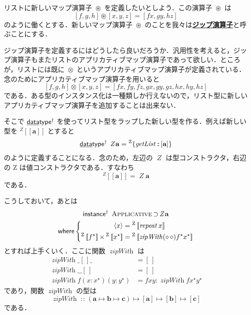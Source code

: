 \documentclass[a4paper,twocolumn]{jsbook}
\def\[{\left[\!\left[}
\def\]{\right]\!\right]}
\newcommand{\keyword}[1]{{\underline{\textbf{#1}}}}
\newcommand{\mKeyword}[1]{\mathsf{#1}} %
\newcommand{\mKeywordUnderline}[1]{\text{\underline{\textsf{#1}}}} %
\newcommand{\mDataTypeKeyword}{\mKeywordUnderline{data}\mKeyword{type}}
\newcommand{\mInstanceKeyword}{\mKeyword{instance}}
\newcommand{\mWhereKeyword}{\mKeyword{where}}
\DeclareMathOperator{\mDataTypeParametric}{\mDataTypeKeyword^\dagger}
\DeclareMathOperator{\mInstanceParametric}{\mInstanceKeyword^{\dagger}}
\DeclareMathOperator{\mSuperSet}{\supset}
\DeclareMathOperator{\mWhere}{\mWhereKeyword}
\newcommand{\mEmptyList}{{[\,]}}
\newcommand{\mAnyParam}{\_}
\newcommand{\mAnonParam}{\diamond}
\newcommand{\mFunc}[1]{\mathop{\mathit{#1}}}
\DeclareMathOperator{\mGetList}{\mFunc{getList}}
\DeclareMathOperator{\mRepeat}{\mFunc{repeat}}
\DeclareMathOperator{\mZipWith}{\mFunc{zipWith}}
\DeclareMathOperator{\mAppMap}{\times}
\DeclareMathOperator{\mAppMapList}{\otimes}
\DeclareMathOperator{\mIn}{{:\!:}}
\DeclareMathOperator{\mMapsTo}{\mapsto}
\DeclareMathOperator{\mZip}{\circledast}
\newcommand{\mZipList}{Z}
\newcommand{\mType}[1]{\mathbf{#1}}
\newcommand{\mListType}[1]{[\mType{#1}]}
\newcommand{\mTypeConstructor}[1]{\textit{#1}}
\DeclareMathOperator{\mZipListTypeConstructor}{\mTypeConstructor{\mZipList}}
\newcommand{\mGenericTypeAssemble}[2]{{}^{\mTypeConstructor{#1}}\[\mType{#2}\]}
\newcommand{\mZipListType}[1]{\mGenericTypeAssemble{\mZipList}{#1}}
\newcommand{\mGenericValueConstructor}[1]{\mathrm{#1}}
\newcommand{\mGenericWith}[2]{{}^\mGenericValueConstructor{#1}\[#2\]}
\newcommand{\mGenericRecordWith}[2]{{}^\mGenericValueConstructor{#1}\{#2\}}
\newcommand{\mZipListWith}[1]{\mGenericWith{\mZipList}{#1}}
\newcommand{\mListWith}[1]{\left[#1\right]}
\newcommand{\mPureWith}[1]{\langle#1\rangle}
\newcommand{\mGenericTypeClass}[1]{\textsc{#1}} %
\newcommand{\mApplicativeTypeClass}{\mGenericTypeClass{Applicative}}
\newcommand{\mList}[1]{{#1}^\mathrm{\star}}
\newcommand{\mProj}[2]{#1\mMapsTo#2}
\begin{document}
リストに新しいマップ演算子 $\mZip$ を定義したいとしよう．この演算子 $\mZip$ は
\begin{equation}
\mListWith{f,g,h}\mZip\mListWith{x,y,z}=\mListWith{fx,gy,hz}
\end{equation}
のように働くとする．新しいマップ演算子 $\mZip$ のことを我々は\keyword{ジップ演算子}と呼ぶことにする．

ジップ演算子を定義するにはどうしたら良いだろうか．汎用性を考えると，ジップ演算子もまたリストのアプリカティブマップ演算子であって欲しい．ところが，リストには既に $\mAppMapList$ というアプリカティブマップ演算子が定義されている．念のためにアプリカティブマップ演算子を用いると
\begin{equation}
\mListWith{f,g,h}\mAppMapList\mListWith{x,y,z}=\mListWith{fx,fy,fz,gx,gy,gz,hx,hy,hz}
\end{equation}
である．ある型のインスタンス化は一種類しか行えないので，リスト型に新しいアプリカティブマップ演算子を追加することは出来ない．

そこで $\mDataTypeParametric$ を使ってリスト型をラップした新しい型を作る．例えば新しい型を $\mZipListType{a}$ とすると
\begin{equation}
\label{eq:data-type-ziplist}
\mDataTypeParametric\;\mZipListTypeConstructor\mType{a}=\mGenericRecordWith{\mZipList}{\mGetList\mIn{}\mListType{a}}
\end{equation}
のように定義することになる．念のため，左辺の $\mZipListTypeConstructor$ は型コンストラクタ，右辺の $\mGenericValueConstructor{\mZipList}$ は値コンストラクタである．すなわち
\begin{equation}
\mZipListType{a}=\mZipListTypeConstructor\mType{a}
\end{equation}
である．


こうしておいて，あとは
\begin{multline}
\mInstanceParametric\;
\mApplicativeTypeClass\mSuperSet\mZipListTypeConstructor\mType{a}\\
\mWhere
\left\{
\begin{aligned}
\mPureWith{x}&=\mZipListWith{\mRepeat x}\\
\mZipListWith{\mList{f}}\mAppMap\mZipListWith{\mList{x}}
&=\mZipListWith{\mZipWith(\mAnonParam\,\mAnonParam)\mList{f}\mList{x}}
\end{aligned}
\right.
\end{multline}
とすれば上手くいく．ここに関数 $\mZipWith$ は
\begin{align}
\mZipWith\mAnyParam\mEmptyList\mAnyParam
&=\mEmptyList\\
\mZipWith\mAnyParam\mAnyParam\mEmptyList
&=\mEmptyList\\
\mZipWith f(x:\mList{x})(y:\mList{y})
&=fxy:\mZipWith f\mList{x}\mList{y}
\end{align}
であり，関数 $\mZipWith$ の型は
\begin{equation}
\mZipWith\mIn{}\mProj{\mProj{\mProj{(\mProj{\mType{a}}{\mProj{\mType{b}}{\mType{c}}})}{\mListType{a}}}{\mListType{b}}}{\mListType{c}}
\end{equation}
である．
\end{document}
